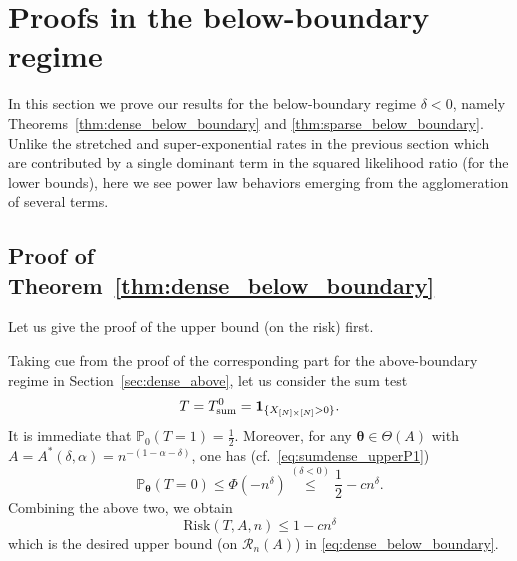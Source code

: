 \documentclass[11pt,reqno,letterpaper]{amsart}
\numberwithin{equation}{section}
\theoremstyle{plain}
\def \btheta{\boldsymbol{\theta}}
\def \P{\mathbb{P}}
\begin{document}
\section{Proofs in the below-boundary regime}\label{sec:below}
In this section we prove our results for the below-boundary regime $\delta < 0$, 
namely Theorems~\ref{thm:dense_below_boundary} and 
\ref{thm:sparse_below_boundary}. Unlike the stretched and super-exponential rates 
in the previous section which are contributed by a single dominant term in the 
squared likelihood ratio (for the lower bounds), here we see power law behaviors 
emerging from the agglomeration of several terms.


\subsection{Proof of 
Theorem~\ref{thm:dense_below_boundary}}\label{subsec:dense_below}
Let us give the proof of the upper bound (on the risk) first.

\smallskip


 Taking cue from the proof of the 
corresponding part for the above-boundary regime in Section~\ref{sec:dense_above}, 
let us consider the sum test 
\begin{equation*}
T = T_{{\rm sum}}^0 = \mathbf{1}_{\{X_{[N]\times[N]} > 0\}}.
\end{equation*}
It is immediate that $\P_0(T=1)=\frac{1}{2}$. Moreover, for any $\btheta\in \Theta(A)$ with $A = A^\ast(\delta, \alpha) = n^{-(1 - \alpha - \delta)}$, one has (cf.~\eqref{eq:sumdense_upperP1})
\begin{equation}\label{eq:Riskupperbb_dense}
\P_{\btheta}(T=0) \leq \Phi(- n^{\delta}) \stackrel{(\delta < 0)}{\leq} \frac{1}{2} - c n^{\delta}.
\end{equation}
Combining the above two, we obtain
\begin{equation*}
\mathrm{Risk}(T, A, n) \le 1 - cn^{\delta}
\end{equation*}
which is the desired upper bound (on $\mathcal R_n(A)$) in 
\eqref{eq:dense_below_boundary}.

\smallskip
\end{document}
